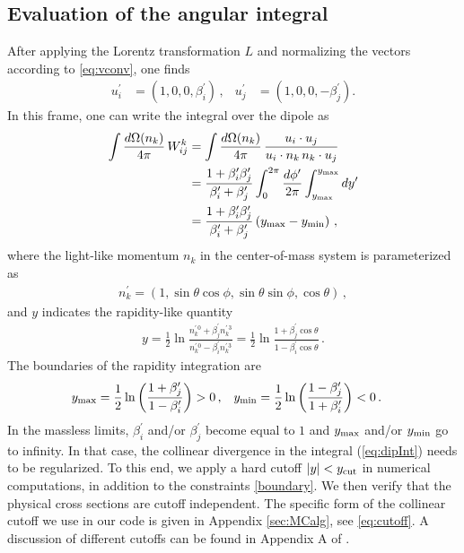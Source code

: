 \documentclass[11pt,a4paper]{article}
\begin{document}
\subsection{Evaluation of the angular integral}

After applying the Lorentz transformation $L$ and normalizing the vectors according to \eqref{eq:vconv}, one finds
\begin{align}
 u^\prime_i &= \left(1,0,0,\beta^\prime_i\right) \, , &  u^\prime_j &=  \left(1,0,0,-\beta^\prime_j\right). 
\end{align}
In this frame, one can write the integral over the dipole as 
\begin{align}
\int\frac{d\Omega(n_k)}{4\pi}\, W_{ij}^k &=\int\frac{d\Omega(n_k)}{4\pi}\, \frac{u_i\cdot u_j}{u_i\cdot n_k \, n_k\cdot u_j}\nonumber\\
&=\frac{1 + \beta^\prime_i \beta^\prime_j}{\beta^\prime_i + \beta^\prime_j }\int_0^{2\pi}\frac{d\phi^\prime}{2\pi}\int_{y_{\rm max}}^{y_{\rm max}} dy^\prime\nonumber\\
&=\frac{1 + \beta^\prime_i \beta^\prime_j}{\beta^\prime_i + \beta^\prime_j }\left(y_{\rm max}-y_{\rm min}\right) \, , 
\label{eq:dipInt}
\end{align}
where the light-like momentum $n_k$ in the center-of-mass system is parameterized as 
\begin{align}
n^\prime_k=\left(1,\sin{\theta}\cos\phi,\sin{\theta}\sin\phi,\cos{\theta}\right) \, ,
\end{align}
and $y$ indicates the rapidity-like quantity
\begin{align}\label{eq:genrap}
	y=\frac{1}{2}\ln\frac{n^{\prime \,0}_k+\beta^\prime_j n^{\prime \,3}_k}{n^{\prime \,0}_k-\beta^\prime_i n^{\prime \,3}_k} = \frac{1}{2}\ln\frac{1+\beta^\prime_j \cos{\theta}}{1-\beta^\prime_i \cos{\theta}} \, .
\end{align}
The boundaries of the rapidity integration are 
\begin{align}\label{boundary}
y_{\rm max} &= \frac{1}{2} \ln \left(\frac{1+\beta^\prime _j}{1-\beta^\prime_i}\right) >0 \, , &  y_{\rm min} &= \frac{1}{2} \ln \left(\frac{1-\beta^\prime _j}{1+\beta^\prime_i}\right) < 0\,.
\end{align}
In the massless limits, $\beta^\prime_i$ and/or $\beta^\prime_j$ become equal to $1$ and $y_{\rm max}$ and/or $y_{\rm min}$ go to infinity. In that case, the collinear divergence in the integral (\ref{eq:dipInt}) needs to be regularized. To this end, we apply a hard cutoff $|y| < y_{\rm cut}$ in numerical computations, in addition to the constraints \eqref{boundary}. We then verify that the physical cross sections are cutoff independent. The specific form of the collinear cutoff we use in our code is given in Appendix \ref{sec:MCalg}, see \eqref{eq:cutoff}. A discussion of different cutoffs can be found in Appendix A of \cite{Balsiger:2018ezi}.
\end{document}
